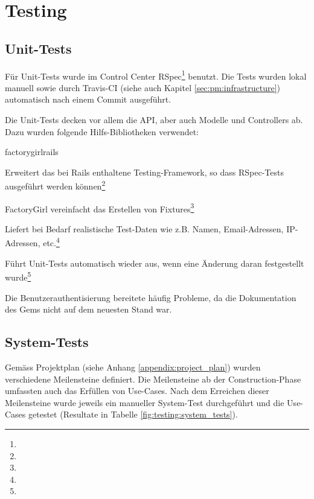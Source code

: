 \section{Testing} \label{sec:umsetzung:testing}

\subsection*{Unit-Tests}

Für Unit-Tests wurde im Control Center RSpec\footnote{} benutzt. Die Tests wurden lokal manuell sowie durch Travis-CI (siehe auch Kapitel \ref{sec:pm:infrastructure}) automatisch nach einem Commit ausgeführt.

Die Unit-Tests decken vor allem die API, aber auch Modelle und Controllers ab. Dazu wurden folgende Hilfs-Bibliotheken verwendet:

\begin{labeling}{factory\textunderscore girl\textunderscore rails}
    \item [rspec-rails] Erweitert das bei Rails enthaltene Testing-Framework, so dass RSpec-Tests ausgeführt werden können\footnote{}
    \item [factory\textunderscore girl\textunderscore rails] FactoryGirl vereinfacht das Erstellen von Fixtures\footnote{}
    \item [faker] Liefert bei Bedarf realistische Test-Daten wie z.B. Namen, Email-Adressen, IP-Adressen, etc.\footnote{}
    \item [guard-rspec] Führt Unit-Tests automatisch wieder aus, wenn eine Änderung daran festgestellt wurde\footnote{}
\end{labeling}

Die Benutzerauthentisierung bereitete häufig Probleme, da die Dokumentation des Gems nicht auf dem neuesten Stand war.

\subsection*{System-Tests}

Gemäss Projektplan (siehe Anhang \ref{appendix:project_plan}) wurden verschiedene Meilensteine definiert. Die Meilensteine ab der Construction-Phase umfassten auch das Erfüllen von Use-Cases. Nach dem Erreichen dieser Meilensteine wurde jeweils ein manueller System-Test durchgeführt und die Use-Cases getestet (Resultate in Tabelle \ref{fig:testing:system_tests}).

